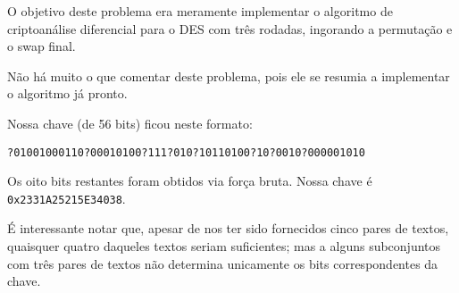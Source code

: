 \documentclass{article}
\begin{document}
O objetivo deste problema era meramente implementar
o algoritmo de criptoanálise diferencial para o DES com três rodadas,
ingorando a permutação e o swap final.

Não há muito o que comentar deste problema,
pois ele se resumia a implementar o algoritmo já pronto.

Nossa chave (de 56 bits) ficou neste formato:

\texttt{?01001000110?00010100?111?010?10110100?10?0010?000001010}

Os oito bits restantes foram obtidos via força bruta.
Nossa chave é \texttt{0x2331A25215E34038}.

É interessante notar que,
apesar de nos ter sido fornecidos cinco pares de textos,
quaisquer quatro daqueles textos seriam suficientes;
mas a alguns subconjuntos com três pares de textos
não determina unicamente os bits correspondentes da chave.
\end{document}
